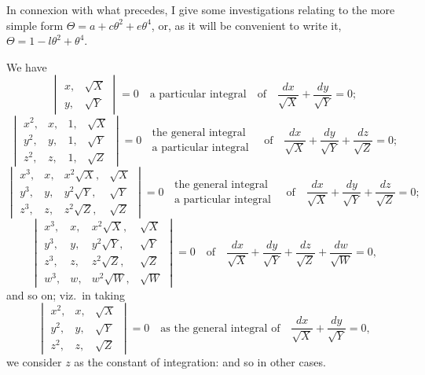 \documentclass[11pt]{article}
\begin{document}
\medskip

In connexion with what precedes, I give some investigations relating to the more simple form $\Theta = a + c\theta^2 + e\theta^4$, or, as it will be convenient to write it, $\Theta = 1 - l\theta^2 + \theta^4$.

We have
\[
\begin{vmatrix} x,& \sqrt{X}\\ y,& \sqrt{Y} \end{vmatrix} = 0 \quad\text{a particular integral}
\quad\text{of}\quad \dfrac{dx}{\sqrt{X}} + \dfrac{dy}{\sqrt{Y}} = 0;
\]
\[
\begin{vmatrix} x^2,& x,& 1,& \sqrt{X}\\ y^2,& y,& 1,& \sqrt{Y}\\ z^2,& z,& 1,& \sqrt{Z} \end{vmatrix} = 0
\;\;
\begin{array}{l}\text{the general integral}\\ \text{a particular integral}\end{array}
\quad\text{of}\quad \dfrac{dx}{\sqrt{X}} + \dfrac{dy}{\sqrt{Y}} + \dfrac{dz}{\sqrt{Z}} = 0;
\]
\[
\begin{vmatrix} x^3,& x,& x^2\sqrt{X},& \sqrt{X}\\ y^3,& y,& y^2\sqrt{Y},& \sqrt{Y}\\ z^3,& z,& z^2\sqrt{Z},& \sqrt{Z} \end{vmatrix} = 0
\;\;
\begin{array}{l}\text{the general integral}\\ \text{a particular integral}\end{array}
\quad\text{of}\quad \dfrac{dx}{\sqrt{X}} + \dfrac{dy}{\sqrt{Y}} + \dfrac{dz}{\sqrt{Z}} = 0;
\]
\[
\begin{vmatrix} x^3,& x,& x^2\sqrt{X},& \sqrt{X}\\ y^3,& y,& y^2\sqrt{Y},& \sqrt{Y}\\ z^3,& z,& z^2\sqrt{Z},& \sqrt{Z}\\ w^3,& w,& w^2\sqrt{W},& \sqrt{W} \end{vmatrix} = 0
\quad\text{of}\quad \dfrac{dx}{\sqrt{X}} + \dfrac{dy}{\sqrt{Y}} + \dfrac{dz}{\sqrt{Z}} + \dfrac{dw}{\sqrt{W}} = 0,
\]
and so on; viz.\ in taking
\[
\begin{vmatrix} x^2,& x,& \sqrt{X}\\ y^2,& y,& \sqrt{Y}\\ z^2,& z,& \sqrt{Z} \end{vmatrix} = 0\quad\text{as the general integral of}\quad \dfrac{dx}{\sqrt{X}} + \dfrac{dy}{\sqrt{Y}} = 0,
\]
we consider $z$ as the constant of integration: and so in other cases.
\end{document}
